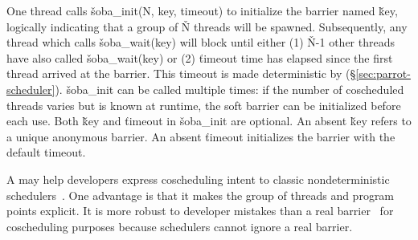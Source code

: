 \noindent
One thread calls \v{soba\_init(N, key, timeout)} to initialize the barrier
named \v{key}, logically indicating that a group of \v{N} threads will
be spawned.  Subsequently, any thread which calls \v{soba\_wait(key)}
will block until either (1) \v{N}-1 other threads have also called
\v{soba\_wait(key)} or (2) \v{timeout} time has elapsed since the first
thread arrived at the barrier.  This timeout is made deterministic by \parrot
(\S\ref{sec:parrot-scheduler}).  \v{soba\_init} can be called multiple
times: if the number of coscheduled threads varies but is known at runtime,
the soft barrier can be initialized before each use.  Both \v{key} and
\v{timeout} in \v{soba\_init} are optional.  An absent \v{key} refers to a
unique anonymous barrier.  An absent \v{timeout} initializes the barrier
with the default timeout.

A \compute may help developers express coscheduling intent to classic
nondeterministic schedulers~\cite{coschedule}.  One advantage is that it
makes the group of threads and program points explicit.  It is more robust
to developer mistakes than a real barrier~\cite{coschedule:sigmetrics96}
for coscheduling purposes because schedulers cannot ignore a real barrier.




